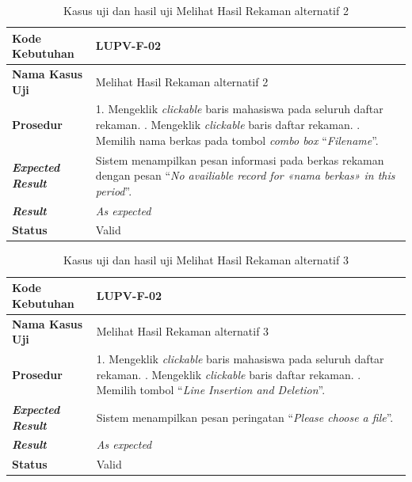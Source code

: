 \begin{longtable}{|L{3cm}|L{9cm}|}
  \caption{Kasus uji dan hasil uji Melihat Hasil Rekaman alternatif 2}\label{tab:show-records-2} \\
  \hline
  \textbf{Kode Kebutuhan} & LUPV-F-02 \\\hline
  \textbf{Nama Kasus Uji} & Melihat Hasil Rekaman alternatif 2\\\hline
  \textbf{Prosedur} & 1. Mengeklik \emph{clickable} baris mahasiswa pada seluruh daftar rekaman. . Mengeklik \emph{clickable} baris daftar rekaman. . Memilih nama berkas pada tombol \emph{combo box}
                      ``\emph{Filename}''.\\\hline
  \textbf{\emph{Expected Result}} & Sistem menampilkan pesan informasi pada berkas rekaman dengan
                                    pesan ``\emph{No availiable record for «nama berkas» in this
                                    period}''.\\\hline
  \textbf{\emph{Result}} & \emph{As expected} \\\hline
  \textbf{Status} & Valid\\\hline
\end{longtable}

\begin{longtable}{|L{3cm}|L{9cm}|}
  \caption{Kasus uji dan hasil uji Melihat Hasil Rekaman alternatif 3}\label{tab:show-records-3} \\
  \hline
  \textbf{Kode Kebutuhan} & LUPV-F-02 \\\hline
  \textbf{Nama Kasus Uji} & Melihat Hasil Rekaman alternatif 3\\\hline
  \textbf{Prosedur} & 1. Mengeklik \emph{clickable} baris mahasiswa pada seluruh daftar rekaman. . Mengeklik \emph{clickable} baris daftar rekaman. . Memilih tombol ``\emph{Line Insertion and Deletion}''. \\\hline
  \textbf{\emph{Expected Result}} & Sistem menampilkan pesan peringatan ``\emph{Please
                                    choose a file}''.\\\hline
  \textbf{\emph{Result}} & \emph{As expected} \\\hline
  \textbf{Status} & Valid\\\hline
\end{longtable}

